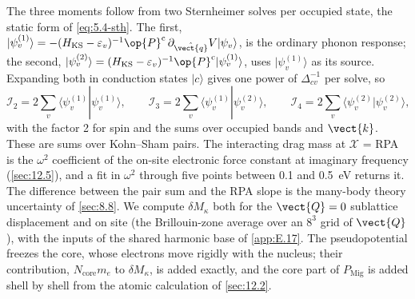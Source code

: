 The three moments follow from two Sternheimer solves per occupied state, the static form of \cref{eq:5.4-sth}. The first, $|\psi^{(1)}_v\rangle = -(H_{\mathrm{KS}} - \varepsilon_v)^{-1}\op{P}^{\mathrm{c}}\,\partial_{\hat{\vect{q}}}V|\psi_v\rangle$, is the ordinary phonon response; the second, $|\psi^{(2)}_v\rangle = (H_{\mathrm{KS}} - \varepsilon_v)^{-1}\op{P}^{\mathrm{c}}|\psi^{(1)}_v\rangle$, uses $|\psi^{(1)}_v\rangle$ as its source. Expanding both in conduction states $|c\rangle$ gives one power of $\Delta_{cv}^{-1}$ per solve, so
\begin{equation}
  \mathcal{I}_2 = 2\sum_v\langle\psi^{(1)}_v|\psi^{(1)}_v\rangle , \qquad
  \mathcal{I}_3 = 2\sum_v\langle\psi^{(1)}_v|\psi^{(2)}_v\rangle , \qquad
  \mathcal{I}_4 = 2\sum_v\langle\psi^{(2)}_v|\psi^{(2)}_v\rangle ,
  \label{eq:E.18-sth}
\end{equation}
with the factor 2 for spin and the sums over occupied bands and $\vect{k}$. These are sums over Kohn--Sham pairs. The interacting drag mass at $\mathcal{X}$ = RPA is the $\omega^2$ coefficient of the on-site electronic force constant at imaginary frequency (\cref{sec:12.5}), and a fit in $\omega^2$ through five points between 0.1 and \SI{0.5}{eV} returns it. The difference between the pair sum and the RPA slope is the many-body theory uncertainty of \cref{sec:8.8}. We compute $\delta M_\kappa$ both for the $\vect{Q} = 0$ sublattice displacement and on site (the Brillouin-zone average over an $8^3$ grid of $\vect{Q}$), with the inputs of the shared harmonic base of \cref{app:E.17}. The pseudopotential freezes the core, whose electrons move rigidly with the nucleus; their contribution, $N_{\mathrm{core}}m_e$ to $\delta M_\kappa$, is added exactly, and the core part of $P_{\mathrm{Mig}}$ is added shell by shell from the atomic calculation of \cref{sec:12.2}.

